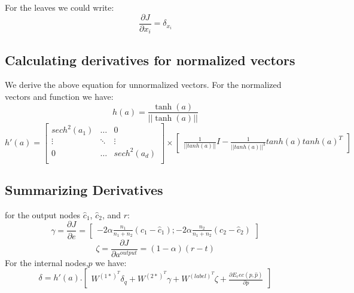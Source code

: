 \documentclass[twoside,12pt]{article}
\begin{document}
For the leaves we could write:
\begin{equation}
\frac{\partial J}{\partial x_i}=\delta_{x_i
}\end{equation}


\subsection{Calculating derivatives for normalized vectors}
We derive the above equation for unnormalized vectors. For the normalized vectors and function we have:
\begin{equation}
h(a)=\frac{\tanh(a)}{||\tanh(a)||}
\end{equation}
\begin{equation}
h'(a)=
\begin{bmatrix}
sech^2(a_1) & \ldots & 0 \\
\vdots & \ddots & \vdots \\
0 & \ldots & sech^2(a_d) \\
\end{bmatrix} \times 
\begin{bmatrix}
\frac{1}{||tanh(a)||}I-\frac{1}{||tanh(a)||^3}tanh(a)tanh(a)^T
\end{bmatrix}
\end{equation}
\subsection{Summarizing Derivatives}
for the output nodes $\hat{c}_1$, $\hat{c}_2$, and $r$:
\begin{equation}
\gamma = \frac{\partial J}{\partial e} = 
\begin{bmatrix}
-2\alpha\frac{n_1}{n_1+n_2}(c_1-\hat{c}_1);-2\alpha\frac{n_2}{n_1+n_2}(c_2-\hat{c}_2)
\end{bmatrix}
\end{equation}
\begin{equation}
\zeta = \frac{\partial J}{\partial a^{output}} = 
(1-\alpha)(r-t)
\end{equation}
For the internal nodes,$p$ we have:
\begin{equation}
\delta = h'(a).
\begin{bmatrix}
W^{{(1*)}^T}\delta_q+W^{{(2*)}^T}\gamma+W^{{(label)}^T}\zeta+\frac{\partial E_rec(p,\hat{p})}{\partial p}
\end{bmatrix}
\end{equation}
\end{document}

